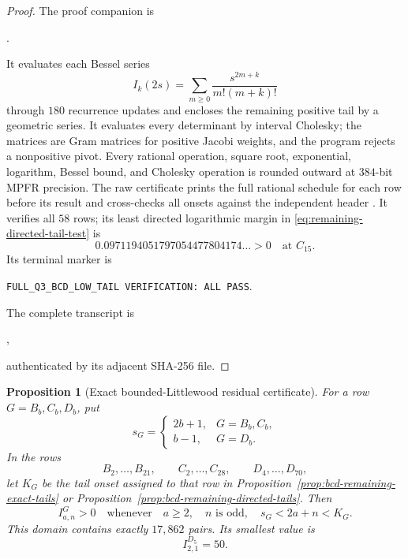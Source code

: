 \documentclass[11pt,reqno]{amsart}
\theoremstyle{plain}
\newtheorem{proposition}[theorem]{Proposition}
\theoremstyle{definition}
\begin{document}
\begin{proof}
The proof companion is
\begin{center}
.
\end{center}
It evaluates each Bessel series
\[
 I_k(2s)=\sum_{m\geq0}\frac{s^{2m+k}}{m!(m+k)!}
\]
through $180$ recurrence updates and encloses the remaining positive tail
by a geometric series.  It evaluates every determinant by interval Cholesky;
the matrices are Gram matrices for positive Jacobi weights, and the program
rejects a nonpositive pivot.  Every rational operation, square root,
exponential, logarithm, Bessel bound, and Cholesky operation is rounded
outward at $384$-bit MPFR precision.  The raw certificate prints the full
rational schedule for each row before its result and cross-checks all onsets
against the independent header
.
It verifies all $58$ rows; its least directed logarithmic margin in
\eqref{eq:remaining-directed-tail-test} is
\[
 0.0971194051797054477804174\ldots>0
 \quad\text{at }C_{15}.
\]
Its terminal marker is
\begin{center}
\small\texttt{FULL\_Q3\_BCD\_LOW\_TAIL VERIFICATION: ALL PASS}.
\end{center}
The complete transcript is
\begin{center}
,
\end{center}
authenticated by its adjacent SHA-256 file.
\end{proof}

\begin{proposition}[Exact bounded-Littlewood residual certificate]
\label{prop:bcd-bounded-littlewood-residual-certificate}
For a row $G=B_b,C_b,D_b$, put
\[
 s_G=\begin{cases}2b+1,&G=B_b,C_b,\\ b-1,&G=D_b.\end{cases}
\]
In the rows
\[
 B_2,\ldots,B_{21},\qquad
 C_2,\ldots,C_{28},\qquad
 D_4,\ldots,D_{70},
\]
let $K_G$ be the tail onset assigned to that row in
Proposition~\ref{prop:bcd-remaining-exact-tails} or
Proposition~\ref{prop:bcd-remaining-directed-tails}.  Then
\[
 I^G_{a,n}>0
 \quad\text{whenever}\quad
 a\geq2,\quad n\text{ is odd},\quad s_G<2a+n<K_G.
\]
This domain contains exactly $17{,}862$ pairs.  Its smallest value is
\[
 I^{D_5}_{2,1}=50.
\]
\end{proposition}
\end{document}
